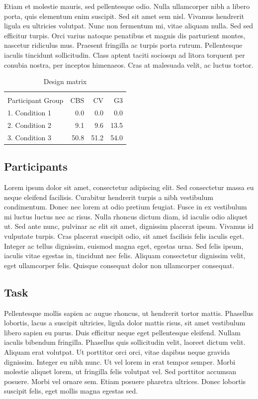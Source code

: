 Etiam et molestie mauris, sed pellentesque odio. Nulla ullamcorper nibh a libero porta, quis elementum enim suscipit. Sed sit amet sem nisl. Vivamus hendrerit ligula eu ultricies volutpat. Nunc non fermentum mi, vitae aliquam nulla. Sed sed efficitur turpis. Orci varius natoque penatibus et magnis dis parturient montes, nascetur ridiculus mus. Praesent fringilla ac turpis porta rutrum. Pellentesque iaculis tincidunt sollicitudin. Class aptent taciti sociosqu ad litora torquent per conubia nostra, per inceptos himenaeos. Cras at malesuada velit, ac luctus tortor.

\begin{table}[!ht]\centering

\begin{tabular}{lrrr}
\\\\
Participant Group & CBS & CV & G3 \\
\midrule
1. Condition 1 & 0.0 & 0.0 & 0.0 \\
2. Condition 2 & 9.1 & 9.6 & 13.5 \\
3. Condition 3 & 50.8 & 51.2 & 54.0\\
\bottomrule
\end{tabular}
\caption{Design matrix}
\end{table}

\subsection*{Participants}
Lorem ipsum dolor sit amet, consectetur adipiscing elit. Sed consectetur massa eu neque eleifend facilisis. Curabitur hendrerit turpis a nibh vestibulum condimentum. Donec nec lorem at odio pretium feugiat. Fusce in ex vestibulum mi luctus luctus nec ac risus. Nulla rhoncus dictum diam, id iaculis odio aliquet ut. Sed ante nunc, pulvinar ac elit sit amet, dignissim placerat ipsum. Vivamus id vulputate turpis. Cras placerat suscipit odio, sit amet facilisis felis iaculis eget. Integer ac tellus dignissim, euismod magna eget, egestas urna. Sed felis ipsum, iaculis vitae egestas in, tincidunt nec felis. Aliquam consectetur dignissim velit, eget ullamcorper felis. Quisque consequat dolor non ullamcorper consequat.

\subsection*{Task}
Pellentesque mollis sapien ac augue rhoncus, ut hendrerit tortor mattis. Phasellus lobortis, lacus a suscipit ultricies, ligula dolor mattis risus, sit amet vestibulum libero sapien eu purus. Duis efficitur neque eget pellentesque eleifend. Nullam iaculis bibendum fringilla. Phasellus quis sollicitudin velit, laoreet dictum velit. Aliquam erat volutpat. Ut porttitor orci orci, vitae dapibus neque gravida dignissim. Integer eu nibh nunc. Ut vel lorem in erat tempor semper. Morbi molestie aliquet lorem, ut fringilla felis volutpat vel. Sed porttitor accumsan posuere. Morbi vel ornare sem. Etiam posuere pharetra ultrices. Donec lobortis suscipit felis, eget mollis magna egestas sed.

